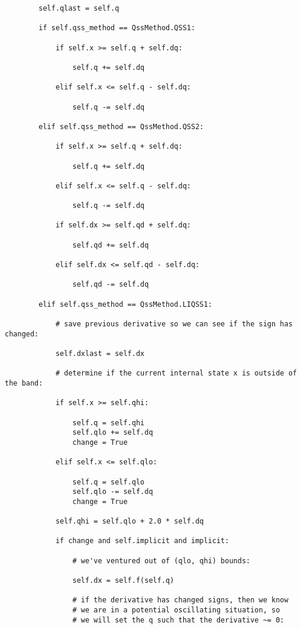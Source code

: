 \begin{lstlisting}
        self.qlast = self.q

        if self.qss_method == QssMethod.QSS1:

            if self.x >= self.q + self.dq:

                self.q += self.dq

            elif self.x <= self.q - self.dq:

                self.q -= self.dq

        elif self.qss_method == QssMethod.QSS2:

            if self.x >= self.q + self.dq:

                self.q += self.dq

            elif self.x <= self.q - self.dq:

                self.q -= self.dq

            if self.dx >= self.qd + self.dq:
            
                self.qd += self.dq
            
            elif self.dx <= self.qd - self.dq:
            
                self.qd -= self.dq

        elif self.qss_method == QssMethod.LIQSS1:

            # save previous derivative so we can see if the sign has changed:

            self.dxlast = self.dx

            # determine if the current internal state x is outside of the band:

            if self.x >= self.qhi:

                self.q = self.qhi
                self.qlo += self.dq
                change = True

            elif self.x <= self.qlo:

                self.q = self.qlo
                self.qlo -= self.dq
                change = True

            self.qhi = self.qlo + 2.0 * self.dq

            if change and self.implicit and implicit:

                # we've ventured out of (qlo, qhi) bounds:

                self.dx = self.f(self.q)

                # if the derivative has changed signs, then we know
                # we are in a potential oscillating situation, so
                # we will set the q such that the derivative ~= 0:


\end{lstlisting}
